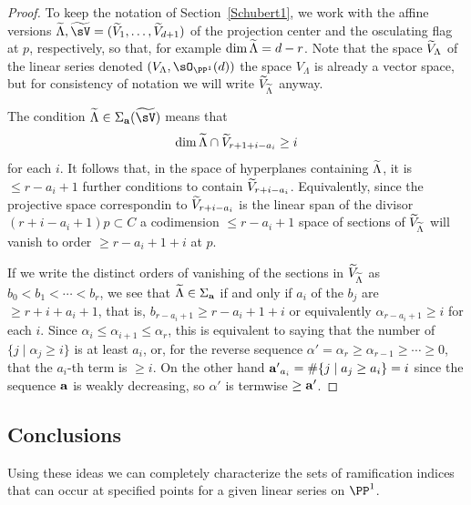 %


\begin{proof}
To keep the notation of Section~\ref{Schubert1}, we work with the affine versions
$\tL, \tsV = (\tV_1, \dots, \tV_{d+1})$ of the projection center and the osculating flag at $p$, respectively,
so that, for example $\dim \tL = d-r$. Note that the space $\tV_\Lambda$ of the linear series 
denoted $(V_\Lambda, \sO_{\PP^1}(d))$ the space $V_\Lambda$
is already a vector space, but for consistency of notation we will write $\tV_\tL$ anyway.

The condition $\tL \in \Sigma_{\bf a}({\tsV})$
 means that 
$$
\dim \tL \cap \tV_{r+1+i-a_i} \geq i
$$
for each $i$. It follows that, 
in the space of hyperplanes containing $\tL$, it is $\leq r-a_i+1$ further conditions to contain $\tV_{r+i-a_i}$. Equivalently,
since the projective space correspondin to $\tV_{r+i-a_i}$ is the linear span of the divisor $(r+i-a_i+1)p\subset C$
a codimension $\leq r-a_i+1$ space of sections of $\tV_\tL$ will vanish to order $\geq r -a_i+1+i$ at $p$. 

If we write the distinct orders of vanishing of the sections in $\tV_\tL$ as
$b_0 < b_1<  \cdots < b_r$, we see that $\tL \in \Sigma_{\bf a}$  if and only if
$a_i$ of the $b_j$ are $\geq r+i+a_i+1$, that is,
$b_{r-a_i+1}\geq r-a_i+1+i$ or equivalently $\alpha_{r-a_i+1}\geq i$ for each $i$.
Since $\alpha_i\leq \alpha_{i+1} \leq \alpha_r$,
this is equivalent to saying that the number of $\{j \mid \alpha_j \geq i\}$ is at least $a_i$, or, for the
reverse sequence $\alpha' = \alpha_r \geq \alpha_{r-1} \geq \cdots \geq 0$, that the $a_i$-th term is $\geq i$.
On the other hand ${\bf a'}_{a_i} = \#\{j\mid a_j \geq a_i\} = i$ since the sequence ${\bf a}$ is weakly
decreasing, so $\alpha'$ is termwise $\geq {\bf a'}$.
\end{proof}

\subsection{Conclusions}

Using these ideas we can completely characterize the sets of ramification indices that can occur at specified points for a given
linear series on $\PP^1$. 

